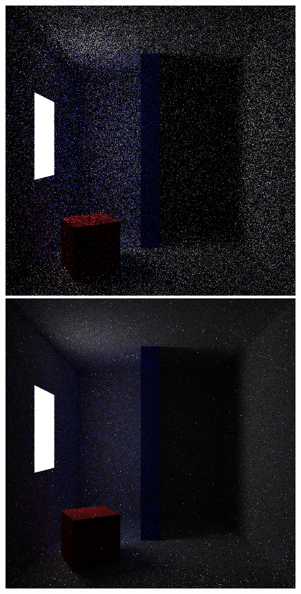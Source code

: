 \documentclass[ %
                    author={Callum Pearce},
                supervisor={Dr. Neill Campbell},
                    degree={MEng},
                     title={How effective are Temporal difference learning methods for reducing the number of zero contribution light paths, while still accurately approximating Global Illumination in Path tracing?},
                  subtitle={},
                      type={research},
                      year={2019} ]{dissertation}
\begin{document}
\begin{figure}[h]
\centering
\begin{minipage}{.45\textwidth}
\includegraphics[width=0.99\textwidth]{images/renders/simple_room/default_16.png}    
\end{minipage}\hspace{2em}
\begin{minipage}{.45\textwidth}
\includegraphics[width=0.99\textwidth]{images/renders/simple_room/reinforcement_16.png}    

\end{minipage}
\end{figure}
\end{document}
